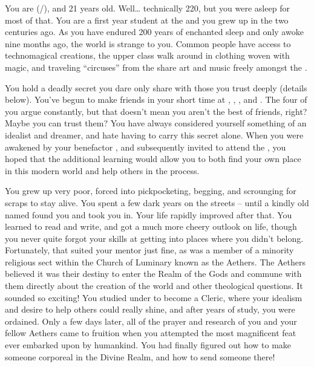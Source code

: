 \documentclass[char]{GL2020}
\begin{document}
\name{\cDisney{}}


You are \cDisney{\full} (\cDisney{\they}/\cDisney{\them}), and 21 years old. Well\ldots{} technically 220, but you were asleep for most of that. You are a first year student at the \pSchool{} and you grew up in the \pFarm{} two centuries ago. As you have endured 200 years of enchanted sleep and only awoke nine months ago, the world is strange to you. Common people have access to technomagical creations, the upper class walk around in clothing woven with magic, and traveling ``circuses'' from the \pTech{} share art and music freely amongst the \pFarmers{}.

You hold a deadly secret you dare only share with those you trust deeply (details below). You've begun to make friends in your short time at \pSchool{}, \cPirateChild{\full}, \cTechStar{\full}, and \cAdopted{\full}. The four of you argue constantly, but that doesn't mean you aren't the best of friends, right? Maybe you can trust them? You have always considered yourself something of an idealist and dreamer, and hate having to carry this secret alone. When you were awakened by your benefactor \cWildCard{\full}, and subsequently invited to attend the \pSchool{}, you hoped that the additional learning would allow you to both find your own place in this modern world and help others in the process.

You grew up very poor, forced into pickpocketing, begging, and scrounging for scraps to stay alive. You spent a few dark years on the streets -- until a kindly old \cDisneyMentor{\cleric} named \cDisneyMentor{} found you and took you in. Your life rapidly improved after that. You learned to read and write, and got a much more cheery outlook on life, though you never quite forgot your skills at getting into places where you didn't belong. Fortunately, that suited your mentor just fine, as \cDisneyMentor{\they} was a member of a minority religious sect within the Church of Luminary known as the Aethers. The Aethers believed it was their destiny to enter the Realm of the Gods and commune with them directly about the creation of the world and other theological questions. It sounded so exciting! You studied under \cDisneyMentor{} to become a Cleric, where your idealism and desire to help others could really shine, and after years of study, you were ordained. Only a few days later, all of the prayer and research of you and your fellow Aethers came to fruition when you attempted the most magnificent feat ever embarked upon by humankind. You had finally figured out how to make someone corporeal in the Divine Realm, and how to send someone there!
\end{document}

